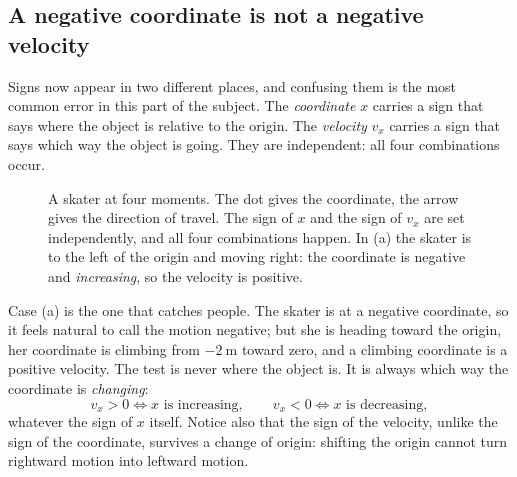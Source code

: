 \documentclass[11pt,twoside,openany]{book}
\begin{document}
\subsection{A negative coordinate is not a negative velocity}

Signs now appear in two different places, and confusing them is the most common error in this part of the subject. The \emph{coordinate} $x$ carries a sign that says where the object is relative to the origin. The \emph{velocity} $v_x$ carries a sign that says which way the object is going. They are independent: all four combinations occur.

\begin{figure}[htb]
\centering
{}
\caption{A skater at four moments. The dot gives the coordinate, the arrow gives the direction of travel. The sign of $x$ and the sign of $v_x$ are set independently, and all four combinations happen. In (a) the skater is to the left of the origin and moving right: the coordinate is negative and \emph{increasing}, so the velocity is positive.}
\label{fig:fourcases}
\end{figure}

Case (a) is the one that catches people. The skater is at a negative coordinate, so it feels natural to call the motion negative; but she is heading toward the origin, her coordinate is climbing from $\SI{-2}{\metre}$ toward zero, and a climbing coordinate is a positive velocity. The test is never where the object is. It is always which way the coordinate is \emph{changing}:
\[
v_x > 0 \iff x \text{ is increasing}, \qquad v_x < 0 \iff x \text{ is decreasing},
\]
whatever the sign of $x$ itself. Notice also that the sign of the velocity, unlike the sign of the coordinate, survives a change of origin: shifting the origin cannot turn rightward motion into leftward motion.
\end{document}
